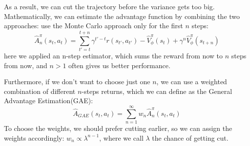 As a result, we can cut the trajectory before the variance gets too big. Mathematically, we can estimate the advantage function by combining the two approaches: use the Monte Carlo approach only for the first $n$ steps:
$$\hat{A}^\pi_n(s_t,a_t) = \sum_{t'=t}^{t+n}\gamma^{t'-t}r(s_{t'},a_{t'}) - \hat{V}^\pi_\phi(s_t)+\gamma^n\hat{V}^\pi_\phi(s_{t+n})$$
here we applied an n-step estimator, which sums the reward from now to $n$ steps from now, and $n>1$ often gives us better performance.

Furthermore, if we don't want to choose just one $n$, we can use a weighted combination of different $n$-steps returns, which we can define as the General Advantage Estimation(GAE):
$$ \hat{A}_{GAE}(s_t,a_t) = \sum_{n=1}^\infty w_n \hat{A}^\pi_n(s_t,a_t)$$
To choose the weights, we should prefer cutting earlier, so we can assign the weights accordingly: $w_n\propto \lambda^{n-1}$, where we call $\lambda$ the chance of getting cut.

